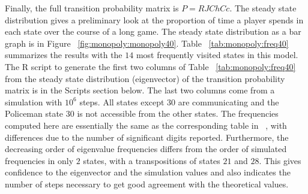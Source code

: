 \documentclass[12pt]{article}
\begin{document}
Finally, the full transition probability matrix is \( P = R J \mathit{Ch}
\mathit{Cc} \).  The steady state distribution gives a preliminary look
at the proportion of time a player spends in each state over the course
of a long game.  The steady state distribution as a bar graph is in
Figure~%
\ref{fig:monopoly:monopoly40}.  Table~%
\ref{tab:monopoly:freq40} summarizes the results with the \( 14 \) most
frequently visited states in this model.  The R script to generate the
first two columns of Table~%
\ref{tab:monopoly:freq40} from the steady state distribution (eigenvector)
of the transition probability matrix is in the Scripts section below.
The last two columns come from a simulation with \( 10^6 \) steps. All
states except \( 30 \) are communicating and the Policeman state \( 30 \)
is not accessible from the other states.  The frequencies computed here
are essentially the same as the corresponding table in~%
\cite{abbott97}, with differences due to the number of significant
digits reported. Furthermore, the decreasing order of eigenvalue
frequencies differs from the order of simulated frequencies in only \( 2
\) states, with a transpositions of states \( 21 \) and \( 28 \).  This
gives confidence to the eigenvector and the simulation values and also
indicates the number of steps necessary to get good agreement with the
theoretical values.
\end{document}
